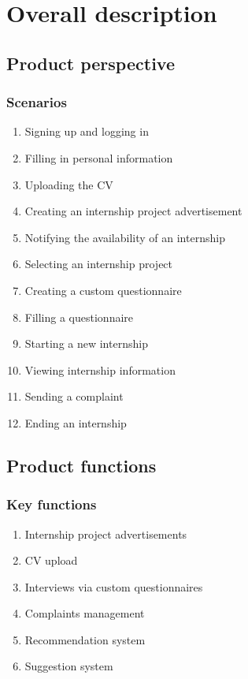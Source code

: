 \chapter{Overall description}

\section{Product perspective}

\subsection{Scenarios}

\begin{enumerate}[label=\textbf{S\arabic* -}]
    \item Signing up and logging in
    \item Filling in personal information
    \item Uploading the CV
    \item Creating an internship project advertisement
    \item Notifying the availability of an internship
    \item Selecting an internship project
    \item Creating a custom questionnaire
    \item Filling a questionnaire
    \item Starting a new internship
    \item Viewing internship information
    \item Sending a complaint
    \item Ending an internship
\end{enumerate}

\section{Product functions}

\subsection{Key functions}

\begin{enumerate}[label=\textbf{KF\arabic* -}]
    \item Internship project advertisements
    \item CV upload
    \item Interviews via custom questionnaires
    \item Complaints management
    \item Recommendation system
    \item Suggestion system
\end{enumerate}

